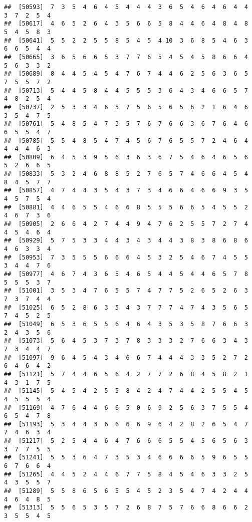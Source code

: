 \documentclass[
]{book}
\begin{document}
\begin{verbatim}
##  [50593]  7  3  5  4  6  4  5  4  4  4  3  6  5  4  6  4  6  4  4  3  7  2  5  4
##  [50617]  4  6  5  2  6  4  3  5  6  6  5  8  4  4  6  4  8  4  8  5  4  5  8  3
##  [50641]  5  5  2  2  5  5  8  5  4  5  4 10  3  6  8  5  4  6  3  6  6  5  4  4
##  [50665]  3  6  5  6  6  5  3  7  7  6  5  4  5  4  5  8  6  6  4  5  6  3  3  2
##  [50689]  8  4  4  5  4  5  4  7  6  7  4  4  6  2  5  6  3  6  5  7  5  5  7  2
##  [50713]  5  4  4  5  8  4  4  5  5  5  3  6  4  3  4  6  6  5  7  4  8  2  5  4
##  [50737]  2  5  3  3  4  6  5  7  5  6  5  6  5  6  2  1  6  4  6  3  5  4  7  5
##  [50761]  5  4  8  5  4  7  3  5  7  6  7  6  6  3  6  7  6  4  6  6  5  5  4  7
##  [50785]  5  5  4  8  5  4  7  4  5  6  7  6  5  5  7  2  4  6  4  4  4  4  6  3
##  [50809]  6  4  5  3  9  5  6  3  6  3  6  7  5  4  6  4  6  5  6  5  2  6  6  5
##  [50833]  5  3  2  4  6  8  8  5  2  7  6  5  7  4  6  6  4  5  4  8  4  5  7  7
##  [50857]  4  7  4  4  3  5  4  3  7  3  4  6  6  4  6  6  9  3  5  4  5  7  5  4
##  [50881]  4  4  6  5  5  4  6  6  8  5  5  5  6  6  5  4  5  5  2  4  6  7  3  6
##  [50905]  2  6  6  4  2  7  4  4  9  4  7  6  2  5  5  7  2  7  4  4  5  4  6  4
##  [50929]  5  7  5  3  3  4  4  3  4  3  4  4  3  8  3  8  6  8  6  4  6  3  3  4
##  [50953]  7  3  5  5  5  6  6  6  4  5  3  2  5  4  6  7  4  5  5  3  4  4  7  6
##  [50977]  4  6  7  4  3  6  5  4  6  5  4  4  5  4  4  6  5  7  8  5  5  5  3  7
##  [51001]  3  5  3  4  7  6  5  5  7  4  7  7  5  2  6  5  2  6  3  7  3  7  4  4
##  [51025]  6  5  2  8  6  3  5  4  3  7  7  7  4  7  4  3  5  6  5  7  4  5  2  5
##  [51049]  6  5  3  6  5  5  6  4  6  4  3  5  3  5  8  7  6  6  3  2  4  3  5  6
##  [51073]  5  6  4  5  3  7  3  7  8  3  3  3  2  7  6  6  3  4  3  7  3  4  4  7
##  [51097]  9  6  4  5  4  3  4  6  6  7  4  4  4  3  3  5  2  7  2  6  4  6  4  2
##  [51121]  5  7  4  4  6  5  6  4  2  7  7  2  6  8  4  5  8  2  1  4  3  1  7  5
##  [51145]  5  4  5  4  2  5  5  8  4  2  4  7  4  4  2  5  5  4  5  4  5  5  5  4
##  [51169]  4  7  6  4  4  6  6  5  0  6  9  2  5  6  3  7  5  5  4  6  5  4  7  8
##  [51193]  5  3  4  4  3  6  6  6  6  9  6  4  2  8  2  6  5  4  7  7  4  6  3  4
##  [51217]  5  2  5  4  4  6  4  7  6  6  6  5  5  4  5  6  5  6  3  3  7  7  5  5
##  [51241]  5  5  3  6  4  7  3  5  3  4  6  6  6  6  5  9  6  5  5  6  7  6  6  4
##  [51265]  4  4  5  2  4  4  6  7  7  5  8  4  5  4  6  3  3  2  5  4  3  5  5  7
##  [51289]  5  5  8  6  5  6  5  5  4  5  2  3  5  4  7  4  2  4  4  4  6  4  8  5
##  [51313]  5  5  6  5  3  5  7  2  6  8  7  5  7  6  6  8  6  6  2  3  5  5  4  5

\end{verbatim}
\end{document}
